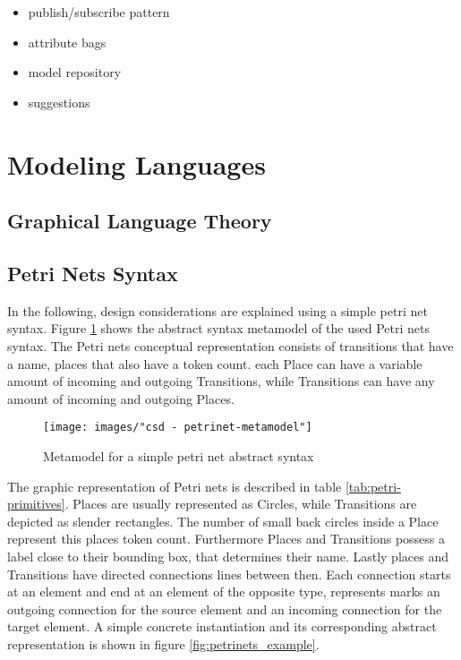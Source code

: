 \begin{itemize}
  \item publish/subscribe pattern
  \item attribute bags
  \item model repository
  \item suggestions
\end{itemize}

\section{Modeling Languages}

\comment{\dots}

\subsection{Graphical Language Theory}
\subsection{Petri Nets Syntax}
In the following, design considerations are explained using a simple petri net syntax. Figure \ref{fig:petrinets_metamodel} shows the abstract syntax metamodel of the used Petri nets syntax. The Petri nets conceptual representation consists of transitions that have a name, places that also have a token count. each Place can have a variable amount of incoming and outgoing Transitions, while Transitions can have any amount of incoming and outgoing Places. 

\begin{figure}[H]
  \centering
  \texttt{[image: images/"csd - petrinet-metamodel"]}
  \caption{Metamodel for a simple petri net abstract syntax}
  \label{fig:petrinets_metamodel}
\end{figure}

The graphic representation of Petri nets is described in table \ref{tab:petri-primitives}. Places are usually represented as Circles, while Transitions are depicted as slender rectangles. The number of small back circles inside a Place represent this places token count. Furthermore Places and Transitions possess a label close to their bounding box, that determines their name. Lastly places and Transitions have directed connections lines between then. Each connection starts at an element and end at an element of the opposite type, represents marks an outgoing connection for the source element and an incoming connection for the target element. A simple concrete instantiation and its corresponding abstract representation is shown in figure \ref{fig:petrinets_example}.

